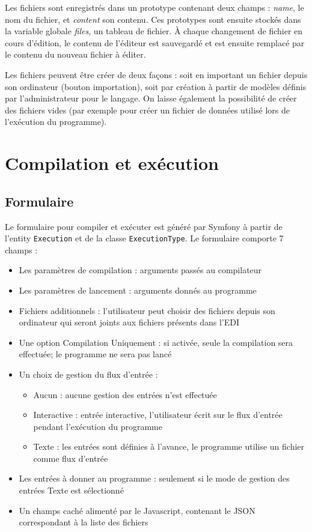 Les fichiers sont enregistrés dans un prototype contenant deux champs : \emph{name}, le nom du fichier, et \emph{content} son contenu. Ces prototypes sont ensuite stockés dans la variable globale \emph{files}, un tableau de fichier. À chaque changement de fichier en cours d'édition, le contenu de l'éditeur est sauvegardé et est ensuite remplacé par le contenu du nouveau fichier à éditer.

Les fichiers peuvent être créer de deux façons : soit en important un fichier depuis son ordinateur (bouton importation), soit par création à partir de modèles définis par l'administrateur pour le langage.
On laisse également la possibilité de créer des fichiers vides (par exemple pour créer un fichier de données utilisé lors de l'exécution du programme).


\section{Compilation et exécution}

\subsection{Formulaire}

Le formulaire pour compiler et exécuter est généré par Symfony à partir de l'entity \texttt{Execution} et de la classe \texttt{ExecutionType}. Le formulaire comporte 7 champs :
\begin{itemize}
  \item Les paramètres de compilation : arguments passés au compilateur
  \item Les paramètres de lancement : arguments donnés au programme
  \item Fichiers additionnels : l'utilisateur peut choisir des fichiers depuis son ordinateur qui seront joints aux fichiers présents dans l'EDI
  \item Une option Compilation Uniquement : si activée, seule la compilation sera effectuée; le programme ne sera pas lancé
  \item{ Un choix de gestion du flux d'entrée :
  \begin{itemize}
    \item Aucun : aucune gestion des entrées n'est effectuée
    \item Interactive : entrée interactive, l'utilisateur écrit sur le flux d'entrée pendant l'exécution du programme
    \item Texte : les entrées sont définies à l'avance, le programme utilise un fichier comme flux d'entrée
  \end{itemize}}
  \item Les entrées à donner au programme : seulement si le mode de gestion des entrées Texte est sélectionné
  \item Un champs caché alimenté par le Javascript, contenant le JSON correspondant à la liste des fichiers
\end{itemize}

